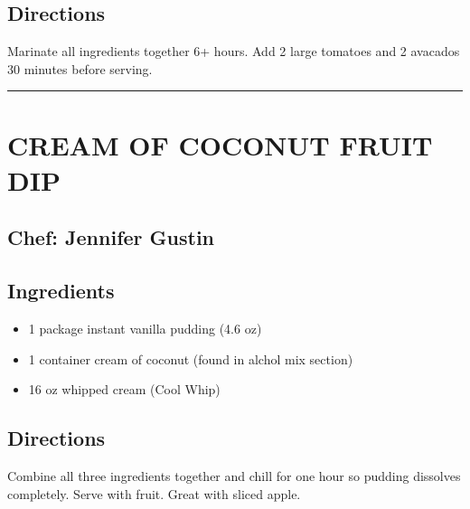 \documentclass[
]{book}
\providecommand{\tightlist}{%
  \setlength{\itemsep}{0pt}\setlength{\parskip}{0pt}}
\begin{document}
\hypertarget{directions-1}{%
\subsection*{Directions}\label{directions-1}}

Marinate all ingredients together 6+ hours. Add 2 large tomatoes and 2 avacados 30 minutes before serving.

\begin{center}\rule{0.5\linewidth}{0.5pt}\end{center}

\hypertarget{cream-of-coconut-fruit-dip}{%
\section*{CREAM OF COCONUT FRUIT DIP}\label{cream-of-coconut-fruit-dip}}

\hypertarget{chef-jennifer-gustin}{%
\subsection*{Chef: Jennifer Gustin}\label{chef-jennifer-gustin}}

\hypertarget{ingredients-2}{%
\subsection*{Ingredients}\label{ingredients-2}}

\begin{itemize}
\tightlist
\item
  1 package instant vanilla pudding (4.6 oz)
\item
  1 container cream of coconut (found in alchol mix section)
\item
  16 oz whipped cream (Cool Whip)
\end{itemize}

\hypertarget{directions-2}{%
\subsection*{Directions}\label{directions-2}}

Combine all three ingredients together and chill for one hour so pudding dissolves completely.
Serve with fruit. Great with sliced apple.
\end{document}
